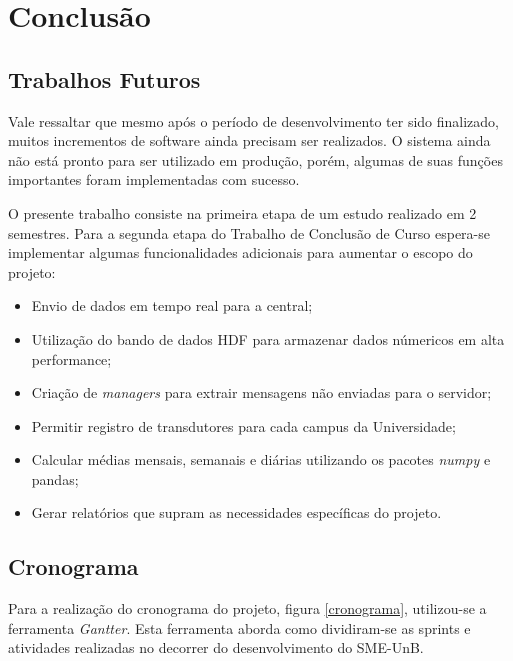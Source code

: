 \chapter{Conclusão}

\section{Trabalhos Futuros}
Vale ressaltar que mesmo após o período de desenvolvimento ter sido finalizado, muitos incrementos de software ainda precisam ser realizados. O sistema ainda não está pronto para ser utilizado em produção, porém, algumas de suas funções importantes foram implementadas com sucesso.

O presente trabalho consiste na primeira etapa de um estudo realizado em 2 semestres. Para a segunda etapa do Trabalho de Conclusão de Curso espera-se implementar algumas funcionalidades adicionais para aumentar o escopo do projeto:
\begin{itemize}
    \item Envio de dados em tempo real para a central;
    \item Utilização do bando de dados HDF para armazenar dados númericos em alta performance;
    \item Criação de \textit{managers} para extrair mensagens não enviadas para o servidor;
    \item Permitir registro de transdutores para cada campus da Universidade;
    \item Calcular médias mensais, semanais e diárias utilizando os pacotes \textit{numpy} e {pandas};
    \item Gerar relatórios que supram as necessidades específicas do projeto.
\end{itemize}

\section{Cronograma}
Para a realização do cronograma do projeto, figura \ref{cronograma}, utilizou-se a ferramenta \textit{Gantter}. Esta ferramenta aborda como dividiram-se as sprints e atividades realizadas no decorrer do desenvolvimento do SME-UnB.

